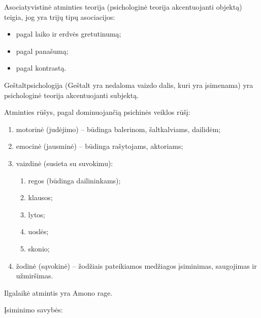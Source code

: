 
Asociatyvistinė atminties teorija (psichologinė teorija akcentuojanti
objektą) teigia, jog yra trijų tipų asociacijos:

\begin{itemize}
  \item pagal laiko ir erdvės gretutinumą;
  \item pagal panašumą;
  \item pagal kontrastą.
\end{itemize}

Geštaltpsichologija (Geštalt yra nedaloma vaizdo dalis, kuri yra įsimenama)
yra psichologinė teorija akcentuojanti subjektą.

Atminties rūšys, pagal dominuojančią psichinės veiklos rūšį:

\begin{enumerate}
  \item motorinė (judėjimo) – būdinga balerinom, šaltkalviams, dailidėm;
  \item emocinė (jausminė) – būdinga rašytojams, aktoriams;
  \item vaizdinė (susieta su suvokimu):
    \begin{enumerate}
      \item regos (būdinga dailininkams);
      \item klausos;
      \item lytos;
      \item uoslės;
      \item skonio;
    \end{enumerate}
  \item žodinė (sąvokinė) – žodžiais pateikiamos medžiagos įsiminimas, 
    saugojimas ir užmiršimas.
\end{enumerate}

Ilgalaikė atmintis yra Amono rage.

\label{tema:atminties_procesai}

Įsiminimo savybės:

